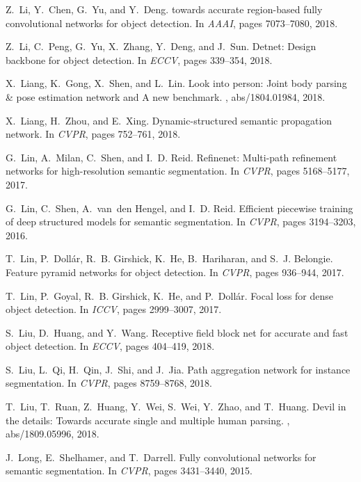 \documentclass[10pt,twocolumn,letterpaper]{article}
\begin{document}
{\begin{thebibliography}{100}
Z.~Li, Y.~Chen, G.~Yu, and Y.~Deng.
 towards accurate region-based fully convolutional networks
  for object detection.
\newblock In {\em {AAAI}}, pages 7073--7080, 2018.

Z.~Li, C.~Peng, G.~Yu, X.~Zhang, Y.~Deng, and J.~Sun.
\newblock Detnet: Design backbone for object detection.
\newblock In {\em {ECCV}}, pages 339--354, 2018.

X.~Liang, K.~Gong, X.~Shen, and L.~Lin.
\newblock Look into person: Joint body parsing {\&} pose estimation network and
  {A} new benchmark.
, abs/1804.01984, 2018.

X.~Liang, H.~Zhou, and E.~Xing.
\newblock Dynamic-structured semantic propagation network.
\newblock In {\em {CVPR}}, pages 752--761, 2018.

G.~Lin, A.~Milan, C.~Shen, and I.~D. Reid.
\newblock Refinenet: Multi-path refinement networks for high-resolution
  semantic segmentation.
\newblock In {\em {CVPR}}, pages 5168--5177, 2017.

G.~Lin, C.~Shen, A.~van~den Hengel, and I.~D. Reid.
\newblock Efficient piecewise training of deep structured models for semantic
  segmentation.
\newblock In {\em {CVPR}}, pages 3194--3203, 2016.

T.~Lin, P.~Doll{\'{a}}r, R.~B. Girshick, K.~He, B.~Hariharan, and S.~J.
  Belongie.
\newblock Feature pyramid networks for object detection.
\newblock In {\em {CVPR}}, pages 936--944, 2017.

T.~Lin, P.~Goyal, R.~B. Girshick, K.~He, and P.~Doll{\'{a}}r.
\newblock Focal loss for dense object detection.
\newblock In {\em {ICCV}}, pages 2999--3007, 2017.

S.~Liu, D.~Huang, and Y.~Wang.
\newblock Receptive field block net for accurate and fast object detection.
\newblock In {\em {ECCV}}, pages 404--419, 2018.

S.~Liu, L.~Qi, H.~Qin, J.~Shi, and J.~Jia.
\newblock Path aggregation network for instance segmentation.
\newblock In {\em {CVPR}}, pages 8759--8768, 2018.

T.~Liu, T.~Ruan, Z.~Huang, Y.~Wei, S.~Wei, Y.~Zhao, and T.~Huang.
\newblock Devil in the details: Towards accurate single and multiple human
  parsing.
, abs/1809.05996, 2018.

J.~Long, E.~Shelhamer, and T.~Darrell.
\newblock Fully convolutional networks for semantic segmentation.
\newblock In {\em {CVPR}}, pages 3431--3440, 2015.


\end{thebibliography}}
\end{document}
